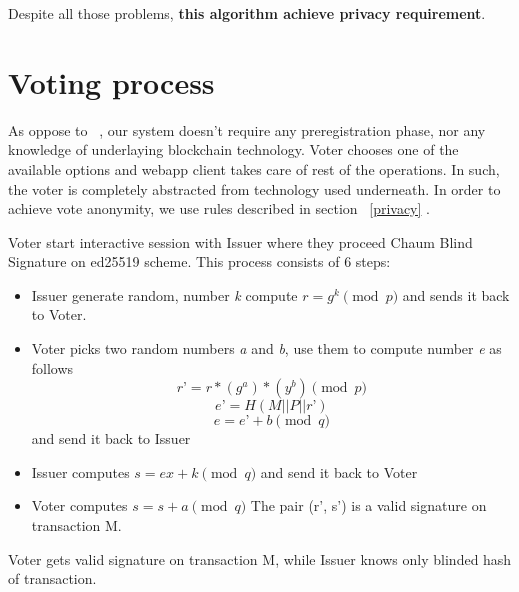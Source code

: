 \documentclass[runningheads]{llncs}
\begin{document}
Despite all those problems, \textbf{this algorithm achieve privacy requirement}.




\section{Voting process}
As oppose to ~\cite{liu2017voting}, our system doesn't require any preregistration phase, nor any knowledge of underlaying blockchain technology.  Voter chooses one of the available options and webapp client takes care of rest of the operations. In such, the voter is completely abstracted from technology used underneath.
In order to achieve vote anonymity, we use rules described in section ~\ref{privacy} .

Voter start interactive session with Issuer where they proceed Chaum Blind Signature \cite{blindsignatureschaum} on ed25519 scheme. This process consists of 6 steps:
\begin{itemize}
\item Issuer generate random, number \textit{k} compute 
\(r = g^k \pmod{p}\)
and sends it back to Voter.
\item Voter picks two random numbers \textit{a} and \textit{b}, use them to compute number \textit{e} as follows
\[r’ = r*(g^a)*(y^b) \pmod{p}\]
\[e’ = H(M || P || r’)\]
\[e = e’ + b \pmod{q}\]
and send it back to Issuer
\item Issuer computes 
\(s = ex + k \pmod{q}\)
and send it back to Voter
\item Voter computes 
$s = s + a \pmod{q}$
The pair (r’, s’) is a valid signature on transaction M.
\end{itemize}
Voter gets valid signature on transaction M, while Issuer knows only blinded hash of transaction.
\end{document}
